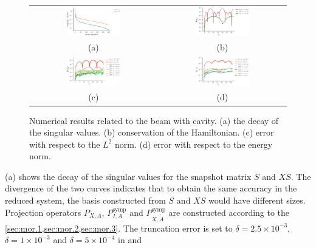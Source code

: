 \begin{figure} \label{fig:1.1}
\begin{tabular}{cc}
\includegraphics[width=0.45\textwidth]{./figs/beam_cracked/singulars} & \includegraphics[width=0.45\textwidth]{./figs/beam_cracked/energy} \\
(a) & (b) \\
\includegraphics[width=0.45\textwidth]{./figs/beam_cracked/l2} & \includegraphics[width=0.45\textwidth]{./figs/beam_cracked/energy_norm} \\
(c) & (d) \\
\end{tabular}
\caption{Numerical results related to the beam with cavity. (a) the decay of the singular values. (b) conservation of the Hamiltonian. (c) error with respect to the $L^2$ norm. (d) error with respect to the energy norm.}
\end{figure}

(a) shows the decay of the singular values for the snapshot matrix $S$ and $XS$. The divergence of the two curves indicates that to obtain the same accuracy in the reduced system, the basis constructed from $S$ and $XS$ would have different sizes.
Projection operators $P_{X,A}$, $P_{I,A}^{\text{symp}}$ and $P_{X,\tilde A}^{\text{symp}}$ are constructed according to the \cref{sec:mor.1,sec:mor.2,sec:mor.3}. The truncation error is set to $\delta = 2.5\times 10^{-3}$, 
$\delta = 1\times 10^{-3}$ and $\delta = 5\times 10^{-4}$ in  and 

